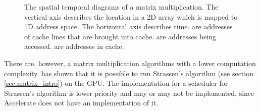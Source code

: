 \documentclass{article}
\begin{document}
\begin{figure}
{
        \label{fig:st_matrix_column}
    }

    \caption{
        The spatial temporal diagrams of a matrix multiplication. The vertical axis describes the location in a 2D array which is mapped to 1D address space. The horizontal axis describes time.  are addresses of cache lines that are brought into cache.  are addresses being accessed.  are addresses in cache.
    }
    \label{fig:st_matrix}
\end{figure}

There are, however, a matrix multiplication algorithms with a lower computation complexity. 
\citet{li2011strassen} has shown that it is possible to run Strassen's algorithm (see section \ref{sec:matrix_intro}) on the GPU.
The implementation for a scheduler for Strassen's algorithm is lower priority and may or may not be implemented, since Accelerate does not have an implementation of it.
\end{document}
